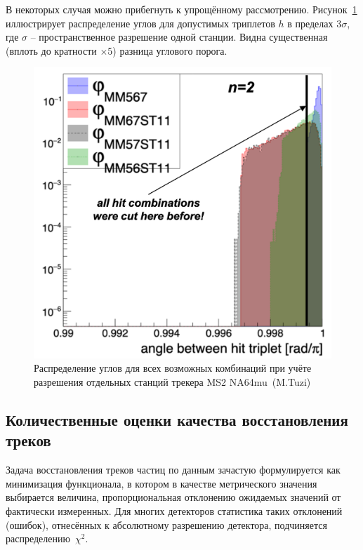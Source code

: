 В некоторых случая можно прибегнуть к упрощённому рассмотрению.
Рисунок~\ref{fig:na64-cutoff-angle} иллюстрирует распределение углов
для допустимых триплетов $h$ в пределах $3\sigma$, где $\sigma$ -- пространственное
разрешение одной станции. Видна существенная (вплоть до кратности $\times5$) разница
углового порога.
\begin{figure}[ht]
    \centering
    \includegraphics[width=0.5\linewidth]{images//illustrative/na64-cutoff-effic.png}
    \caption{Распределение углов для всех возможных комбинаций при учёте разрешения
    отдельных станций трекера MS2 NA64mu~(M.Tuzi)}
    \label{fig:na64-cutoff-angle}
\end{figure}

\subsection{Количественные оценки качества восстановления треков}

Задача восстановления треков частиц по данным зачастую формулируется
как минимизация функционала, в котором в качестве метрического значения
выбирается величина, пропорциональная отклонению ожидаемых значений
от фактически измеренных. Для многих детекторов статистика таких
отклонений (ошибок), отнесённых к абсолютному разрешению детектора,
подчиняется распределению~$\chi^2$.

